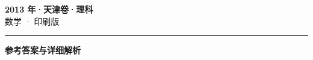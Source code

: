 \documentclass[zihao=5, a4paper]{ctexart}
\begin{document}
\begin{center}
  {\Large\bfseries 2013 年·天津卷·理科}\\[4pt]
  {\large 数学 · 印刷版}
\end{center}
\medskip
{}

\par\bigskip\hrule\bigskip
{}
\Needspace{0.55\textheight}
\begin{center}{\large\bfseries 参考答案与详细解析}\end{center}
\smallskip

\end{document}
